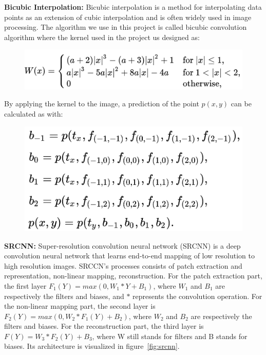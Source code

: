 \documentclass[10pt,twocolumn,letterpaper]{article}
\begin{document}
{\bf Bicubic Interpolation: }Bicubic interpolation is a method for interpolating data points as an extension of cubic interpolation and is often widely used in image processing. The algorithm we use in this project is called bicubic convolution algorithm where the kernel used in the project us designed as:
\begin{figure}[h]
    \centering
    \includegraphics[width=\linewidth]{bicubic.png}
\end{figure}
By applying the kernel to the image, a prediction of the point $p(x,y)$ can be calculated as with: 
\begin{figure}[h]
    \centering
    \includegraphics[width=\linewidth]{bicubic2.png}
\end{figure}

{\bf SRCNN: }Super-resolution convolution neural network (SRCNN) is a deep convolution neural network that learns end-to-end mapping of low resolution to high resolution images\cite{dong2015image}. SRCCN's processes consists of patch extraction and representation, non-linear mapping, reconstruction. For the patch extraction part, the first layer $F_1(Y) = max (0, W_1 \ast Y + B_1)$, where $W_1$ and $B_1$ are respectively the filters and biases, and $\ast$ represents the convolution operation. For the non-linear mapping part, the second layer is $F_2(Y) = max (0, W_2 \ast F_1(Y) + B_2)$, where $W_2$ and $B_2$ are respectively the filters and biases. For the reconstruction part, the third layer is $F(Y) = W_3 * F_2(Y) + B_3$, where W still stands for filters and B stands for biases. Its architecture is visualized in figure~\ref{fig:srcnn}.
\end{document}
